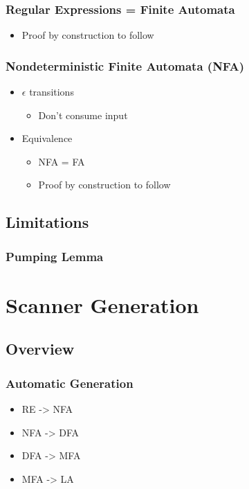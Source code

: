 \documentclass[usepdftitle=false,professionalfonts,compress ]{beamer}
\begin{document}
{
\begin{frame}\frametitle{Regular Expressions = Finite Automata}

	\begin{itemize}
	\item Proof by construction to follow
				\end{itemize}

\end{frame}}



{
\begin{frame}\frametitle{Nondeterministic Finite Automata (NFA)}

	\begin{itemize}
	\item $\epsilon$ transitions

	\begin{itemize}
	\item Don't consume input
				\end{itemize}

			\item Equivalence

	\begin{itemize}
	\item NFA = FA
			\item Proof by construction to follow
				\end{itemize}

				\end{itemize}

\end{frame}}




\subsection{Limitations}

{
\begin{frame}\frametitle{Pumping Lemma}

\end{frame}}


\section{Scanner Generation}
		
\subsection{Overview}

{
\begin{frame}\frametitle{Automatic Generation}

	\begin{itemize}
	\item RE -> NFA
			\item NFA -> DFA
			\item DFA -> MFA
			\item MFA -> LA
				\end{itemize}

\end{frame}}
\end{document}
